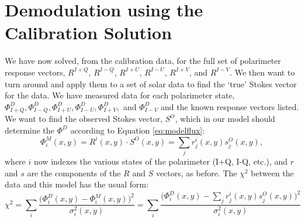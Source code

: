 \documentclass[11pt]{article}
\begin{document}
\section{Demodulation using the Calibration Solution}\label{sec:demodulation}

We have now solved, from the calibration data, for the full set of polarimeter response vectors, $R^{I+Q}$, $R^{I-Q}$, $R^{I+U}$, $R^{I-U}$, $R^{I+V}$, and $R^{I-V}$. We then want to turn around and apply them to a set of solar data to find the `true' Stokes vector for the data. We have measured data for each polarimeter state, $\Phi^D_{I+Q}, \Phi^D_{I-Q}, \Phi^D_{I+U}, \Phi^D_{I-U}, \Phi^D_{I+V},$ and $\Phi^D_{I-V}$ and the known response vectors listed. We want to find the observed Stokes vector, $S^O$, which in our model should determine the $\Phi^D$ according to Equation \ref{eq:modelflux}:
\begin{equation}
	\Phi^M_i(x,y) = R^i(x,y)\cdot S^O(x,y) = \sum_j r^i_j(x,y) s^O_j(x,y),
\end{equation}
where $i$ now indexes the various states of the polarimeter (I+Q, I-Q, etc.), and $r$ and $s$ are the components of the $R$ and $S$ vectors, as before. The $\chi^2$ between the data and this model has the usual form:
\begin{equation}
	\chi^2 = \sum_{i} \frac{\big(\Phi^D_i(x,y)-\Phi^M_i(x,y)\big)^2}{\sigma^2_i(x,y)} = \sum_{i} \frac{\big(\Phi^D_i(x,y)-\sum_j r^i_j(x,y) s^O_j(x,y)\big)^2}{\sigma^2_i(x,y)}
\end{equation}
\end{document}
